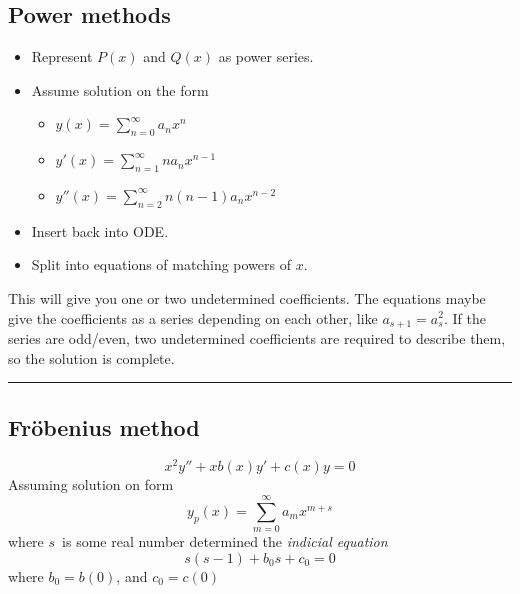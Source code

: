 \documentclass[10pt,a4paper]{article}
\newcommand{\holine}{\rule{286pt}{1pt}}
\begin{document}
\begin{multicols}{2}
\subsection*{Power methods}
\begin{itemize}
    \item Represent $P(x)$ and $Q(x)$ as power series.
    \item Assume solution on the form
    \begin{itemize}
        \item $y(x) = \sum_{n=0}^\infty a_n x^n$
        \item $y'(x) = \sum_{n=1}^\infty n a_n x^{n-1}$
        \item $y''(x) = \sum_{n=2}^\infty n(n-1) a_n x^{n-2}$ 
    \end{itemize}
    \item Insert back into ODE.
    \item Split into equations of matching powers of $x$.
\end{itemize}
This will give you one or two undetermined coefficients. The equations maybe give the coefficients as a series depending on each other, like $a_{s+1} = a_s^2$. If the series are odd/even, two undetermined coefficients are required to describe them, so the solution is complete.



\holine
\subsection*{Fröbenius method}
\[
    x^2 y'' + xb(x)y' + c(x) y = 0
\]
Assuming solution on form
\[
    y_p(x) = \sum_{m=0}^\infty a_m x^{m+s}
\]
where $s$ is some real number determined  the \textit{indicial equation}
\[
    s(s-1) + b_0s + c_0 = 0
\]
where $b_0=b(0)$, and $c_0=c(0)$


\end{multicols}
\end{document}
